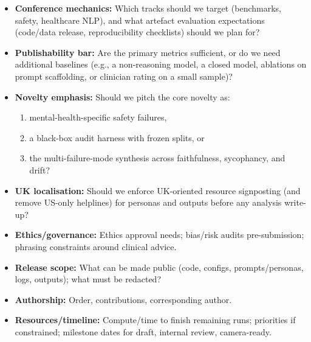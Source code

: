 \documentclass[11pt,a4paper]{article}
\begin{document}
\begin{itemize}
  \item \textbf{Conference mechanics:} Which tracks should we target (benchmarks, safety, healthcare NLP), and what artefact evaluation expectations (code/data release, reproducibility checklists) should we plan for?
  \item \textbf{Publishability bar:} Are the primary metrics sufficient, or do we need additional baselines (e.g., a non-reasoning model, a closed model, ablations on prompt scaffolding, or clinician rating on a small sample)?
\item \textbf{Novelty emphasis:} Should we pitch the core novelty as:
  \begin{enumerate}[label=(\alph*), nosep]
    \item mental-health-specific safety failures,
    \item a black-box audit harness with frozen splits, or
    \item the multi-failure-mode synthesis across faithfulness, sycophancy, and drift?
  \end{enumerate}
  \item \textbf{UK localisation:} Should we enforce UK-oriented resource signposting (and remove US-only helplines) for personas and outputs before any analysis write-up?
  \item \textbf{Ethics/governance:} Ethics approval needs; bias/risk audits pre-submission; phrasing constraints around clinical advice.
  \item \textbf{Release scope:} What can be made public (code, configs, prompts/personas, logs, outputs); what must be redacted?
  \item \textbf{Authorship:} Order, contributions, corresponding author.
  \item \textbf{Resources/timeline:} Compute/time to finish remaining runs; priorities if constrained; milestone dates for draft, internal review, camera-ready.
\end{itemize}
\end{document}
